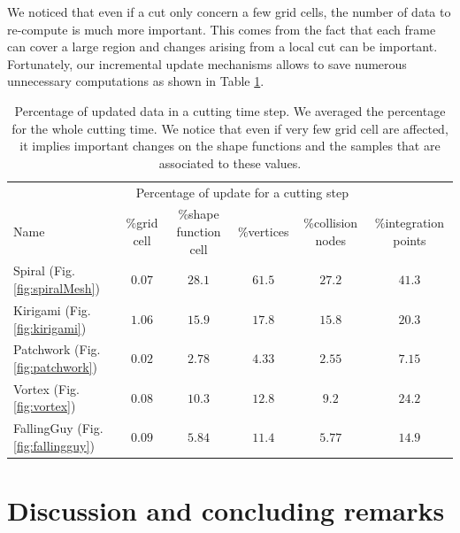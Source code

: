 We noticed that even if a cut only concern a few grid cells, the number of data to re-compute is much more important. This comes from the fact that each frame can cover a large region and changes arising from a local cut can be important. Fortunately, our incremental update mechanisms allows to save numerous unnecessary computations as shown in Table \ref{tab:incrementalUpdate}. 

\begin{table}[!h]
	\centering
	\scalebox{0.7}
	{
		\begin{tabular}{l|ccccc}
			& \multicolumn{4}{c}{Percentage of update for a cutting step} \\
			Name & \%grid cell &\%shape function cell & \%vertices & \%collision nodes & \%integration points \\ \hline
			Spiral (Fig. \ref{fig:spiralMesh}) & $0.07$ & $28.1$ & $61.5$ & $27.2$ & $41.3$\\
			Kirigami (Fig. \ref{fig:kirigami}) & $1.06$ & $15.9$ & $17.8$ & $15.8$ & $20.3$\\
			Patchwork (Fig. \ref{fig:patchwork}) & $0.02$ & $2.78$ & $4.33$ & $2.55$ & $7.15$\\
			Vortex (Fig. \ref{fig:vortex}) & $0.08$ & $10.3$ & $12.8$ & $9.2$ & $24.2$\\
			FallingGuy (Fig. \ref{fig:fallingguy}) & $0.09$ & $5.84$ & $11.4$ & $5.77$ & $14.9$\\
		\end{tabular}
	}
	\caption[Frame-based cutting: Incremental update timings]{\label{tab:incrementalUpdate} Percentage of updated data in a cutting time step. We averaged the percentage for the whole cutting time. We notice that even if very few grid cell are affected, it implies important changes on the shape functions and the samples that are associated to these values.}
\end{table}

\section{Discussion and concluding remarks} 
\label{sec:cutting_conclusion}

